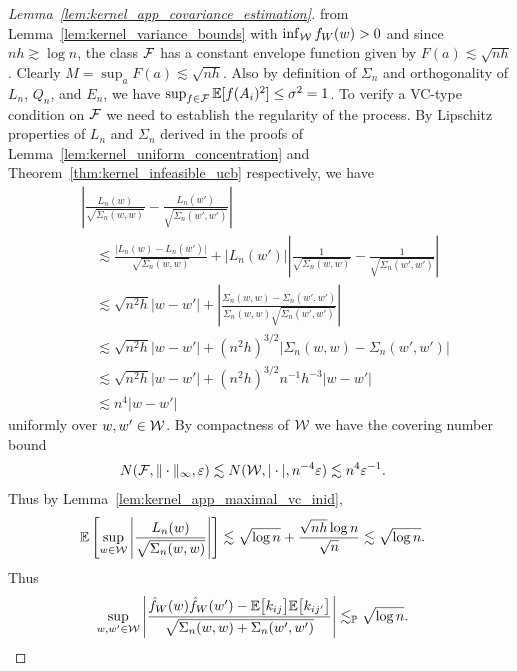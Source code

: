 \begin{proof}[Lemma~\ref{lem:kernel_app_covariance_estimation}]
  from Lemma~\ref{lem:kernel_variance_bounds}
  with $\inf_{\mathcal{W}} f_W(w) > 0$ and since $n h \gtrsim \log n$,
  the class $\mathcal{F}$ has a constant envelope function
  given by $F(a) \lesssim \sqrt{n h}$.
  Clearly $M = \sup_a F(a) \lesssim \sqrt{n h}$.
  Also by definition of $\Sigma_n$
  and orthogonality of $L_n$, $Q_n$, and $E_n$,
  we have
  $\sup_{f \in \mathcal{F}} \mathbb{E}[f(A_i)^2] \leq \sigma^2 = 1$.
  To verify a VC-type condition on $\mathcal{F}$
  we need to establish the regularity of the process.
  By Lipschitz properties
  of $L_n$ and $\Sigma_n$
  derived in the proofs of Lemma~\ref{lem:kernel_uniform_concentration}
  and Theorem~\ref{thm:kernel_infeasible_ucb}
  respectively,
  we have
  \begin{align*}
    &\left|
    \frac{L_n(w)}
    {\sqrt{\Sigma_n(w,w)}}
    - \frac{L_n(w')}
    {\sqrt{\Sigma_n(w',w')}}
    \right| \\
    &\quad\lesssim
    \frac{\big|L_n(w) - L_n(w')\big|}
    {\sqrt{\Sigma_n(w,w)}}
    +
    \left| L_n(w') \right|
    \left|
    \frac{1}
    {\sqrt{\Sigma_n(w,w)}}
    - \frac{1}
    {\sqrt{\Sigma_n(w',w')}}
    \right| \\
    &\quad\lesssim
    \sqrt{n^2h}
    |w-w'|
    +\left|
    \frac{\Sigma_n(w,w) - \Sigma_n(w',w')}
    {\Sigma_n(w,w)\sqrt{\Sigma_n(w',w')}}
    \right| \\
    &\quad\lesssim
    \sqrt{n^2h}
    |w-w'|
    + (n^2h)^{3/2}
    \left|
    \Sigma_n(w,w) - \Sigma_n(w',w')
    \right| \\
    &\quad\lesssim
    \sqrt{n^2h}
    |w-w'|
    + (n^2h)^{3/2}
    n^{-1} h^{-3}
    |w-w'| \\
    &\quad\lesssim
    n^4 |w-w'|
  \end{align*}
  uniformly over $w,w' \in \mathcal{W}$. By compactness of $\mathcal{W}$ we have the covering
  number bound
  \begin{align*}
    N(\mathcal{F}, \|\cdot\|_\infty, \varepsilon)
    &\lesssim
    N(\mathcal{W}, |\cdot|, n^{-4} \varepsilon)
    \lesssim n^4 \varepsilon^{-1}.
  \end{align*}
  Thus by Lemma~\ref{lem:kernel_app_maximal_vc_inid},
  \begin{align*}
    \mathbb{E} \left[
      \sup_{w \in \mathcal{W}}
      \left|
      \frac{L_n(w)}
      {\sqrt{\Sigma_n(w,w)}}
      \right|
    \right]
    &\lesssim
    \sqrt{\log n}
    + \frac{\sqrt{n h} \log n}{\sqrt{n}}
    \lesssim
    \sqrt{\log n}.
  \end{align*}
  Thus
  \begin{align*}
    \sup_{w,w' \in \mathcal{W}}
    \left|
    \frac{
      \hat f_W(w) \hat f_W(w')
    - \mathbb{E}\big[k_{i j}\big] \mathbb{E}\big[k_{i j'}\big]}
    {\sqrt{\Sigma_n(w,w) + \Sigma_n(w',w')}}
    \right|
    &\lesssim_{\mathbb{P}}
    \sqrt{\log n}.
  \end{align*}


\end{proof}
